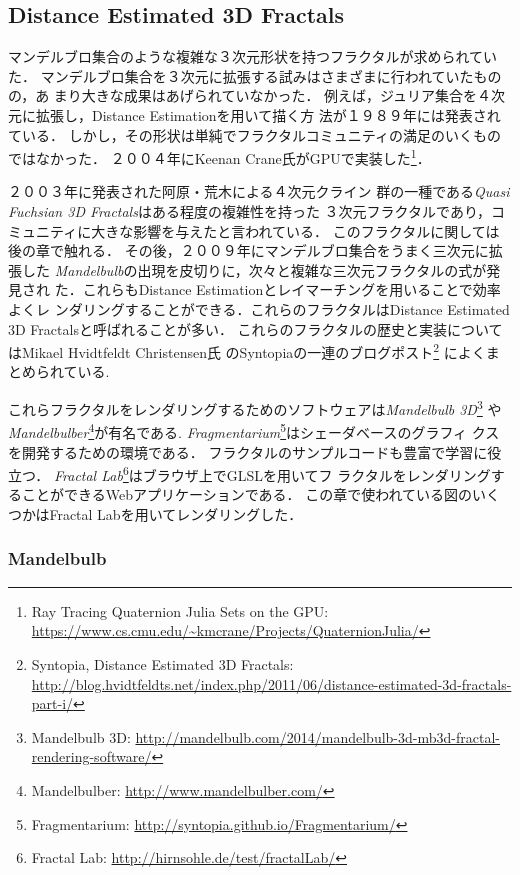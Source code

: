 \subsection{Distance Estimated 3D Fractals}

マンデルブロ集合のような複雑な３次元形状を持つフラクタルが求められていた．
マンデルブロ集合を３次元に拡張する試みはさまざまに行われていたものの，あ
まり大きな成果はあげられていなかった．
例えば，ジュリア集合を４次元に拡張し，Distance Estimationを用いて描く方
法が１９８９年には発表されている\cite{4djulia}．
しかし，その形状は単純でフラクタルコミュニティの満足のいくものではなかった．
２００４年にKeenan Crane氏がGPUで実装した\footnote{Ray Tracing
Quaternion Julia Sets on the GPU:
\url{https://www.cs.cmu.edu/~kmcrane/Projects/QuaternionJulia/}}．

２００３年に発表された阿原・荒木\cite{sphairahedra}による４次元クライン
群の一種である{\it Quasi Fuchsian 3D Fractals}はある程度の複雑性を持った
３次元フラクタルであり，コミュニティに大きな影響を与えたと言われている．
このフラクタルに関しては後の章で触れる．
その後，２００９年にマンデルブロ集合をうまく三次元に拡張した{\it
Mandelbulb}の出現を皮切りに，次々と複雑な三次元フラクタルの式が発見され
た．これらもDistance Estimationとレイマーチングを用いることで効率よくレ
ンダリングすることができる．これらのフラクタルはDistance Estimated 3D
Fractalsと呼ばれることが多い．
これらのフラクタルの歴史と実装についてはMikael Hvidtfeldt Christensen氏
のSyntopiaの一連のブログポスト\footnote{Syntopia, Distance Estimated 3D
Fractals:\\ \quad \quad
\url{http://blog.hvidtfeldts.net/index.php/2011/06/distance-estimated-3d-fractals-part-i/}}
によくまとめられている.

これらフラクタルをレンダリングするためのソフトウェアは{\it Mandelbulb
3D}\footnote{Mandelbulb 3D:
\url{http://mandelbulb.com/2014/mandelbulb-3d-mb3d-fractal-rendering-software/}}
や{\it Mandelbulber}\footnote{Mandelbulber:
\url{http://www.mandelbulber.com/}}が有名である.
{\it Fragmentarium}\footnote{Fragmentarium:
\url{http://syntopia.github.io/Fragmentarium/}}はシェーダベースのグラフィ
クスを開発するための環境である．
フラクタルのサンプルコードも豊富で学習に役立つ．
{\it Fractal Lab}\footnote{Fractal Lab:
\url{http://hirnsohle.de/test/fractalLab/}}はブラウザ上でGLSLを用いてフ
ラクタルをレンダリングすることができるWebアプリケーションである．
この章で使われている図のいくつかはFractal Labを用いてレンダリングした．

\subsubsection{Mandelbulb}


